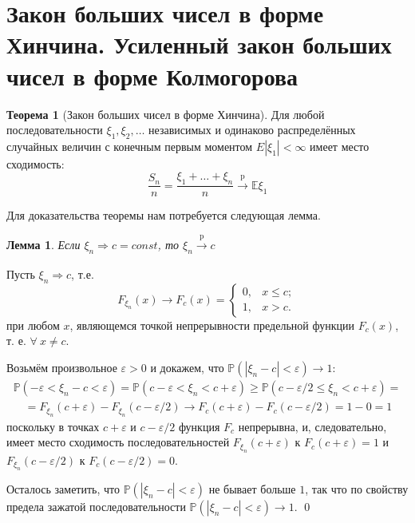 \documentclass[oneside,final,14pt]{extreport}
\renewenvironment{proof}{{\bfseries Доказательство.}}{\qed}
\theoremstyle{plain}
\newtheorem*{lem}{Лемма}
\theoremstyle{definition}
\theoremstyle{named}
\newtheorem*{namedthm}{Теорема}
\begin{document}
\section{Закон больших чисел в форме Хинчина. Усиленный закон больших чисел в форме Колмогорова}
\begin{namedthm}[Закон больших чисел в форме Хинчина] \leavevmode

    Для любой последовательности $\xi_{1}, \xi_{2}, \ldots$ независимых и одинаково распределённых случайных величин с конечным первым моментом $E\left|\xi_{1}\right|<\infty$ имеет место сходимость:
    \begin{equation*}
        \frac{S_{n}}{n} = \frac{\xi_{1}+\ldots+\xi_{n}}{n} %
        \stackrel{\text{p}}{\longrightarrow} \mathbb{E}\xi_1
    \end{equation*}
\end{namedthm}
Для доказательства теоремы нам потребуется следующая лемма.
\begin{lem}
    Если $\xi_{n} \Rightarrow c=const$, то $\xi_{n} \xrightarrow[]{\text{p}} c$
\end{lem}
\begin{proof}
    Пусть $\xi_{n} \Rightarrow c$, т.е.
    \begin{equation*}
        F_{\xi_{n}}(x) \rightarrow F_{c}(x) =
        \begin{cases}
            0, & x \leqslant c; \\
            1, & x > c.
        \end{cases}
    \end{equation*}
    при любом $x$, являющемся точкой непрерывности предельной функции $F_{c}(x)$, т. е. $\forall~ x \neq c$.
    
    Возьмём произвольное $\varepsilon>0$ и докажем, что $\mathbb{P}\left(\left|\xi_{n}-c\right|<\varepsilon\right) \rightarrow 1$:
    \begin{multline*}
        \mathbb{P}\left(-\varepsilon<\xi_{n}-c<\varepsilon\right)=\mathbb{P}\left(c-\varepsilon<\xi_{n}<c+\varepsilon\right) \geqslant \mathbb{P}\left(c-\varepsilon / 2 \leqslant \xi_{n}<c+\varepsilon\right)= \\
        \quad=F_{\xi_{n}}(c+\varepsilon)-F_{\xi_{n}}(c-\varepsilon / 2) \rightarrow F_{c}(c+\varepsilon)-F_{c}(c-\varepsilon / 2)=1-0=1
    \end{multline*}
    поскольку в точках $c+\varepsilon$ и $c-\varepsilon / 2$ функция $F_{c}$ непрерывна, и, следовательно, имеет место сходимость последовательностей $F_{\xi_{n}}(c+\varepsilon)$ к $F_{c}(c+\varepsilon)=1$ и $F_{\xi_{n}}(c-\varepsilon / 2)$ к $F_{c}(c-\varepsilon / 2)=0$.
    
    Осталось заметить, что $\mathbb{P}\left(\left|\xi_{n}-c\right|<\varepsilon\right)$ не бывает больше $1$, так что по свойству предела зажатой последовательности $\mathbb{P}\left(\left|\xi_{n}-c\right|<\varepsilon\right) \rightarrow 1$.
\end{proof}
\end{document}
